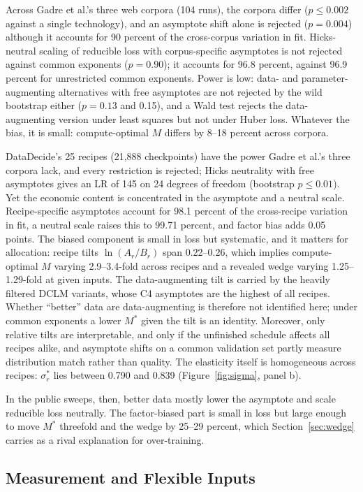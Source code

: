 Across Gadre et al.'s three web corpora (104 runs), the corpora differ ($p\le0.002$ against a single technology), and
an asymptote shift alone is rejected ($p=0.004$) although it accounts for 90 percent of the cross-corpus variation in
fit. Hicks-neutral scaling of reducible loss with corpus-specific asymptotes is not rejected against common exponents
($p=0.90$); it accounts for 96.8 percent, against 96.9 percent for unrestricted common exponents. Power is low:
data- and parameter-augmenting alternatives with free asymptotes are not rejected by the wild bootstrap either ($p=0.13$
and 0.15), and a Wald test rejects the data-augmenting version under least squares but not under Huber loss. Whatever
the bias, it is small: compute-optimal $M$ differs by 8--18 percent across corpora.

DataDecide's 25 recipes (21,888 checkpoints) have the power Gadre et al.'s three corpora lack, and every restriction
is rejected; Hicks neutrality with free asymptotes gives an LR of 145 on 24 degrees of freedom (bootstrap $p\le0.01$).
Yet the economic content is concentrated in the asymptote and a neutral scale. Recipe-specific asymptotes account for
98.1 percent of the cross-recipe variation in fit, a neutral scale raises this to 99.71 percent, and factor bias adds
0.05 points. The biased component is small in loss but systematic, and it matters for allocation: recipe tilts
$\ln(A_r/B_r)$ span 0.22--0.26, which implies compute-optimal $M$ varying 2.9--3.4-fold across recipes and a revealed
wedge varying 1.25--1.29-fold at given inputs. The data-augmenting tilt is carried by the heavily filtered DCLM
variants, whose C4 asymptotes are the highest of all recipes. Whether ``better'' data are data-augmenting is
therefore not identified here; under common exponents a lower $M^*$ given the tilt is an identity. Moreover, only
relative tilts are interpretable, and only if the unfinished schedule affects all recipes alike, and asymptote shifts
on a common validation set partly measure distribution match rather than quality. The elasticity itself is homogeneous across recipes:
$\sigma^*_r$ lies between 0.790 and 0.839 (Figure~\ref{fig:sigma}, panel b).

In the public sweeps, then, better data mostly lower the asymptote and scale reducible loss neutrally. The factor-biased
part is small in loss but large enough to move $M^*$ threefold and the wedge by 25--29 percent, which
Section~\ref{sec:wedge} carries as a rival explanation for over-training.

\subsection{Measurement and Flexible Inputs}\label{sec:tech:measurement}


